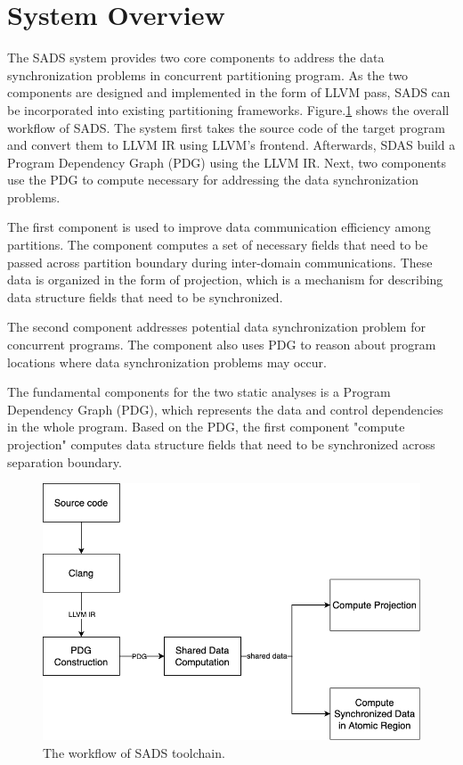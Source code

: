 \documentclass[pageno]{jpaper}
\begin{document}
\section{System Overview}
The SADS system provides two core components to address the data synchronization problems in concurrent partitioning program. As the two components are designed and implemented in the form of LLVM pass, SADS can be incorporated into existing partitioning frameworks. Figure.\ref{figs:system_workflow} shows the overall workflow of SADS. The system first takes the source code of the target program and convert them to LLVM IR using LLVM's frontend. Afterwards, SDAS build a Program Dependency Graph (PDG) using the LLVM IR. Next, two components use the PDG to compute necessary for addressing the data synchronization problems. 

The first component is used to improve data communication efficiency among partitions. The component computes a set of necessary fields that need to be passed across partition boundary during inter-domain communications. These data is organized in the form of projection, which is a mechanism for describing data structure fields that need to be synchronized. 

The second component addresses potential data synchronization problem for concurrent programs. The component also uses PDG to reason about program locations where data synchronization problems may occur. 

The fundamental components for the two static analyses is a Program Dependency Graph (PDG), which represents the data and control dependencies in the whole program. Based on the PDG, the first component "compute projection" computes data structure fields that need to be synchronized across separation boundary.

\begin{figure}[th]
  \centering
  \includegraphics[width=0.9\linewidth]{figs/system_overview.png}
  \caption{The workflow of SADS toolchain.}
  \label{figs:system_workflow}
\end{figure}    
\end{document}
